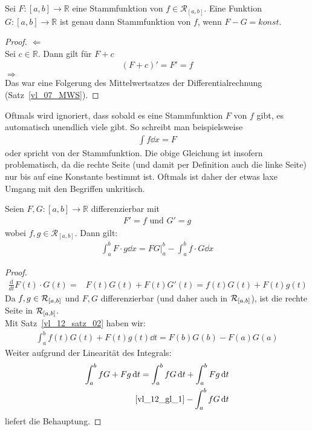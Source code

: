 \begin{Proposition}{
	Sei $F: [a,b] \rightarrow \mathbb{R}$ eine Stammfunktion von $f \in \mathcal{R}
	_{[a,b]}$. Eine Funktion $G: [a,b] \rightarrow \mathbb{R}$ ist genau dann 
	Stammfunktion von $f$, wenn $F-G = konst.$
}\end{Proposition}

\begin{proof}
	 $\Leftarrow$ \\
	Sei $c \in \mathbb{R}$. Dann gilt für $F + c$ 
	\begin{align*}
		(F+ c)' = F' = f
	\end{align*}
	$\Rightarrow$ \\
	Das war eine Folgerung des Mittelwertsatzes der Differentialrechnung 
	(Satz~\ref{vl_07_MWS}).
\end{proof}

\begin{Bemerkung}{
	Oftmals wird ignoriert, dass sobald es eine Stammfunktion $F$ von $f$ gibt, es 
	automatisch unendlich viele gibt. So schreibt man beispielsweise 
	\begin{align*}
		\int f \dd{x} = F
	\end{align*} 
	oder spricht von \glqq der\grqq{} Stammfunktion. Die obige Gleichung ist
	 insofern problematisch, da die rechte Seite (und damit per Definition auch die 
	 linke Seite) nur bis auf eine Konstante bestimmt ist. Oftmals ist daher der 
	 etwas laxe Umgang mit den Begriffen unkritisch.
}\end{Bemerkung}

\begin{Satz}{\label{vl_12_satz_03}
	Seien $F,G: [a,b] \rightarrow \mathbb{R}$ differenzierbar mit 
	\begin{align*}
		F' = f \text{ und } G' = g 
	\end{align*}
	wobei $f,g \in \mathcal{R}_{[a,b]}$. Dann gilt:
	\begin{align*}
		\int_a^b F \cdot g \dd{x} = FG\vert_a^b - \int_a^b f \cdot G \dd{x}
	\end{align*}
}\end{Satz}

\begin{proof}
	\begin{align}\label{vl_12_gl_1}
		\frac{\mathrm{d}}{dt}F(t)\cdot G(t) = & F(t)G(t) + F(t)G'(t) = 
		f(t)G(t) + F(t)g(t)
	\end{align}
	Da $f,g \in \mathcal{R}_{[{a},{b}]}$ und $F,G$ differenzierbar (und daher auch in 
	$\mathcal{R}_{[{a},{b}]}$), ist die rechte Seite in $\mathcal{R}_{[{a},{b}]}$. \\
	Mit Satz~\ref{vl_12_satz_02} haben wir:
	\begin{align*}
		\int_a^b f(t) G(t) + F(t)g(t) \dd{t} = F(b)G(b) -F(a)G(a)
	\end{align*}
	Weiter aufgrund der Linearität des Integrals:
	\begin{align*}
		\int_a^bfG + Fg \dd{t} = \int_a^b fG\dd{t} + \int_a^b Fg\dd{t} \\
		\ref{vl_12_gl_1}-\int_a^b fG\dd{t}
	\end{align*}
	liefert die Behauptung.
\end{proof}

